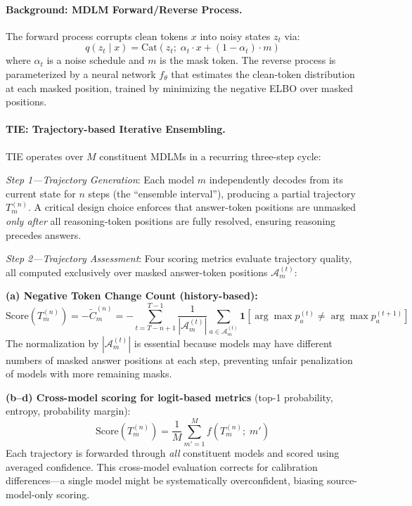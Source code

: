 \documentclass[11pt,a4paper]{article}
\begin{document}
\paragraph{Background: MDLM Forward/Reverse Process.}
The forward process corrupts clean tokens $x$ into noisy states $z_t$ via:
\begin{equation}
q(z_t \mid x) = \mathrm{Cat}(z_t;\; \alpha_t \cdot x + (1 - \alpha_t) \cdot m)
\end{equation}
where $\alpha_t$ is a noise schedule and $m$ is the mask token. The reverse process is parameterized by a neural network $f_\theta$ that estimates the clean-token distribution at each masked position, trained by minimizing the negative ELBO over masked positions.

\paragraph{TIE: Trajectory-based Iterative Ensembling.}
TIE operates over $M$ constituent MDLMs in a recurring three-step cycle:

\emph{Step 1---Trajectory Generation}: Each model $m$ independently decodes from its current state for $n$ steps (the ``ensemble interval''), producing a partial trajectory $T_m^{(n)}$. A critical design choice enforces that answer-token positions are unmasked \emph{only after} all reasoning-token positions are fully resolved, ensuring reasoning precedes answers.

\emph{Step 2---Trajectory Assessment}: Four scoring metrics evaluate trajectory quality, all computed exclusively over masked answer-token positions $\mathcal{A}_m^{(t)}$:

\textbf{(a) Negative Token Change Count (history-based):}
\begin{equation}
\mathrm{Score}(T_m^{(n)}) = -\tilde{C}_m^{(n)} = -\sum_{t=T-n+1}^{T-1} \frac{1}{|\mathcal{A}_m^{(t)}|} \sum_{a \in \mathcal{A}_m^{(t)}} \mathbf{1}\!\left[\arg\max p_a^{(t)} \neq \arg\max p_a^{(t+1)}\right]
\end{equation}
The normalization by $|\mathcal{A}_m^{(t)}|$ is essential because models may have different numbers of masked answer positions at each step, preventing unfair penalization of models with more remaining masks.

\textbf{(b--d) Cross-model scoring for logit-based metrics} (top-1 probability, entropy, probability margin):
\begin{equation}
\mathrm{Score}(T_m^{(n)}) = \frac{1}{M} \sum_{m'=1}^{M} f(T_m^{(n)};\; m')
\end{equation}
Each trajectory is forwarded through \emph{all} constituent models and scored using averaged confidence. This cross-model evaluation corrects for calibration differences---a single model might be systematically overconfident, biasing source-model-only scoring.
\end{document}
